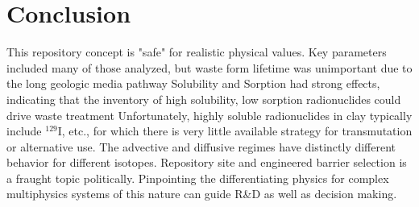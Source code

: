 \section{Conclusion}

This repository concept is "safe" for realistic physical values.  Key parameters 
included many of those analyzed, but waste form lifetime was unimportant due to 
the long geologic media pathway Solubility and Sorption had strong effects, 
indicating that the inventory of high solubility, low sorption radionuclides 
could drive waste treatment Unfortunately, highly soluble radionuclides in clay 
typically include $^{129}$I, etc., for which there is very little available 
strategy for transmutation or alternative use.  The advective and diffusive 
regimes have distinctly different behavior for different isotopes.  Repository 
site and engineered barrier selection is a fraught topic politically.  
Pinpointing the differentiating physics for complex multiphysics systems of this 
nature can guide R\&D as well as decision making. 


